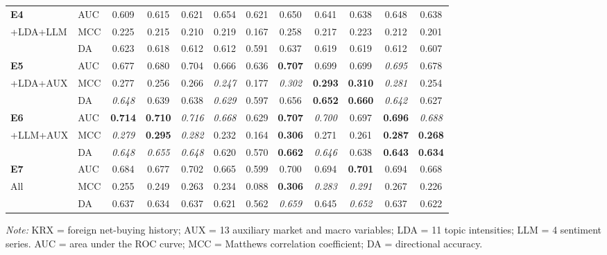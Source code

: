 \begin{table}[t]
\begin{tabular}{@{} l l cccccccccc @{}}
\midrule
\textbf{E4} & AUC & 0.609 & 0.615 & 0.621 & 0.654 & 0.621 & 0.650 & 0.641 & 0.638 & 0.648 & 0.638 \\
+LDA+LLM & MCC & 0.225 & 0.215 & 0.210 & 0.219 & 0.167 & 0.258 & 0.217 & 0.223 & 0.212 & 0.201 \\
 & DA & 0.623 & 0.618 & 0.612 & 0.612 & 0.591 & 0.637 & 0.619 & 0.619 & 0.612 & 0.607 \\
\midrule
\textbf{E5} & AUC & 0.677 & 0.680 & 0.704 & 0.666 & 0.636 & \textbf{0.707} & 0.699 & 0.699 & \textit{0.695} & 0.678 \\
+LDA+AUX & MCC & 0.277 & 0.256 & 0.266 & \textit{0.247} & 0.177 & \textit{0.302} & \textbf{0.293} & \textbf{0.310} & \textit{0.281} & 0.254 \\
 & DA & \textit{0.648} & 0.639 & 0.638 & \textit{0.629} & 0.597 & 0.656 & \textbf{0.652} & \textbf{0.660} & \textit{0.642} & 0.627 \\
\midrule
\textbf{E6} & AUC & \textbf{0.714} & \textbf{0.710} & \textit{0.716} & \textit{0.668} & 0.629 & \textbf{0.707} & \textit{0.700} & 0.697 & \textbf{0.696} & \textit{0.688} \\
+LLM+AUX & MCC & \textit{0.279} & \textbf{0.295} & \textit{0.282} & 0.232 & 0.164 & \textbf{0.306} & 0.271 & 0.261 & \textbf{0.287} & \textbf{0.268} \\
 & DA & \textit{0.648} & \textit{0.655} & \textit{0.648} & 0.620 & 0.570 & \textbf{0.662} & \textit{0.646} & 0.638 & \textbf{0.643} & \textbf{0.634} \\
\midrule
\textbf{E7} & AUC & 0.684 & 0.677 & 0.702 & 0.665 & 0.599 & 0.700 & 0.694 & \textbf{0.701} & 0.694 & 0.668 \\
All & MCC & 0.255 & 0.249 & 0.263 & 0.234 & 0.088 & \textbf{0.306} & \textit{0.283} & \textit{0.291} & 0.267 & 0.226 \\
 & DA & 0.637 & 0.634 & 0.637 & 0.621 & 0.562 & \textit{0.659} & 0.645 & \textit{0.652} & 0.637 & 0.622 \\
\bottomrule
\end{tabular}
\par\smallskip\raggedright\footnotesize\textit{Note:} KRX = foreign net-buying history; AUX = 13 auxiliary market and macro variables; LDA = 11 topic intensities; LLM = 4 sentiment series. AUC = area under the ROC curve; MCC = Matthews correlation coefficient; DA = directional accuracy.
\end{table}
